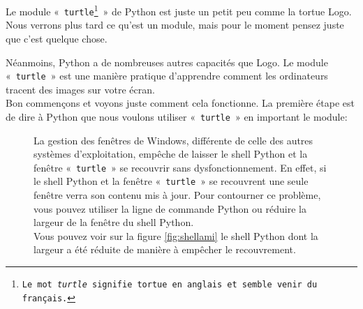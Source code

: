 Le module «~\texttt{turtle\footnote{Le mot \emph{turtle} signifie tortue en anglais et semble venir du français.}}~» de Python est juste un petit peu comme la tortue Logo.
Nous verrons plus tard ce qu'est un module, mais 
pour le moment pensez juste que c'est quelque chose.

Néanmoins, Python a de nombreuses autres capacités que Logo. Le module «~\texttt{turtle}~» est une manière pratique 
 d'apprendre comment les ordinateurs tracent des images sur votre écran.\\

Bon commençons et voyons juste comment cela fonctionne. La première étape est de dire à Python que nous voulons utiliser «~\texttt{turtle}~» en important le module:

\begin{figure}[ht]
\begin{minipage}{0.4\linewidth}
La gestion des fenêtres de Windows, différente de celle des autres systèmes d'exploitation, empêche de laisser le shell Python et la fenêtre «~\texttt{turtle}~» se recouvrir sans dysfonctionnement. En effet, si le shell Python et la fenêtre «~\texttt{turtle}~» se recouvrent une seule fenêtre verra son contenu mis à jour. Pour contourner ce problème, vous pouvez utiliser la ligne de commande Python ou réduire la largeur de la fenêtre du shell Python.\\

Vous pouvez voir sur la figure \ref{fig:shellami} le shell Python dont la largeur a été réduite de manière à empêcher le recouvrement.\\


\end{minipage}
\end{figure}
